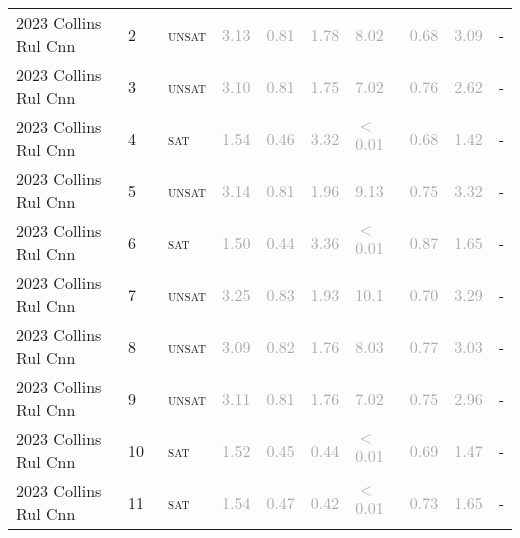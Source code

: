 \begin{center}
{\begin{longtable}{@{}llllllllll@{}}
2023 Collins Rul Cnn & 2 & ~\textsc{unsat} & \textcolor{darkgray}{3.13} & \textcolor{darkgray}{0.81} & \textcolor{darkgray}{1.78} & \textcolor{darkgray}{8.02} & \textcolor{darkgray}{0.68} & \textcolor{darkgray}{3.09} & - \\
2023 Collins Rul Cnn & 3 & ~\textsc{unsat} & \textcolor{darkgray}{3.10} & \textcolor{darkgray}{0.81} & \textcolor{darkgray}{1.75} & \textcolor{darkgray}{7.02} & \textcolor{darkgray}{0.76} & \textcolor{darkgray}{2.62} & - \\
2023 Collins Rul Cnn & 4 & ~\textsc{sat} & \textcolor{darkgray}{1.54} & \textcolor{darkgray}{0.46} & \textcolor{darkgray}{3.32} & \textcolor{darkgray}{$<$0.01} & \textcolor{darkgray}{0.68} & \textcolor{darkgray}{1.42} & - \\
2023 Collins Rul Cnn & 5 & ~\textsc{unsat} & \textcolor{darkgray}{3.14} & \textcolor{darkgray}{0.81} & \textcolor{darkgray}{1.96} & \textcolor{darkgray}{9.13} & \textcolor{darkgray}{0.75} & \textcolor{darkgray}{3.32} & - \\
2023 Collins Rul Cnn & 6 & ~\textsc{sat} & \textcolor{darkgray}{1.50} & \textcolor{darkgray}{0.44} & \textcolor{darkgray}{3.36} & \textcolor{darkgray}{$<$0.01} & \textcolor{darkgray}{0.87} & \textcolor{darkgray}{1.65} & - \\
2023 Collins Rul Cnn & 7 & ~\textsc{unsat} & \textcolor{darkgray}{3.25} & \textcolor{darkgray}{0.83} & \textcolor{darkgray}{1.93} & \textcolor{darkgray}{10.1} & \textcolor{darkgray}{0.70} & \textcolor{darkgray}{3.29} & - \\
2023 Collins Rul Cnn & 8 & ~\textsc{unsat} & \textcolor{darkgray}{3.09} & \textcolor{darkgray}{0.82} & \textcolor{darkgray}{1.76} & \textcolor{darkgray}{8.03} & \textcolor{darkgray}{0.77} & \textcolor{darkgray}{3.03} & - \\
2023 Collins Rul Cnn & 9 & ~\textsc{unsat} & \textcolor{darkgray}{3.11} & \textcolor{darkgray}{0.81} & \textcolor{darkgray}{1.76} & \textcolor{darkgray}{7.02} & \textcolor{darkgray}{0.75} & \textcolor{darkgray}{2.96} & - \\
2023 Collins Rul Cnn & 10 & ~\textsc{sat} & \textcolor{darkgray}{1.52} & \textcolor{darkgray}{0.45} & \textcolor{darkgray}{0.44} & \textcolor{darkgray}{$<$0.01} & \textcolor{darkgray}{0.69} & \textcolor{darkgray}{1.47} & - \\
2023 Collins Rul Cnn & 11 & ~\textsc{sat} & \textcolor{darkgray}{1.54} & \textcolor{darkgray}{0.47} & \textcolor{darkgray}{0.42} & \textcolor{darkgray}{$<$0.01} & \textcolor{darkgray}{0.73} & \textcolor{darkgray}{1.65} & - \\

\end{longtable}}
\end{center}

